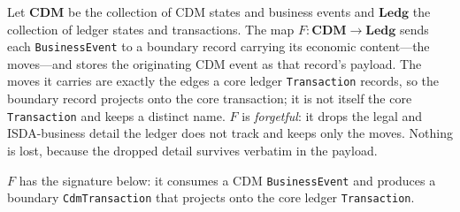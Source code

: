 \documentclass[11pt,a4paper]{article}
\begin{document}
Let $\mathbf{CDM}$ be the collection of CDM states and business events and $\mathbf{Ledg}$ the collection of ledger states and transactions. The map $F : \mathbf{CDM} \to \mathbf{Ledg}$ sends each \texttt{BusinessEvent} to a boundary record carrying its economic content---the moves---and stores the originating CDM event as that record's payload. The moves it carries are exactly the edges a core ledger \texttt{Transaction} records, so the boundary record projects onto the core transaction; it is not itself the core \texttt{Transaction} and keeps a distinct name. $F$ is \textit{forgetful}: it drops the legal and ISDA-business detail the ledger does not track and keeps only the moves. Nothing is lost, because the dropped detail survives verbatim in the payload.

\medskip
$F$ has the signature below: it consumes a CDM \texttt{BusinessEvent} and produces a boundary \texttt{CdmTransaction} that projects onto the core ledger \texttt{Transaction}.
\end{document}
